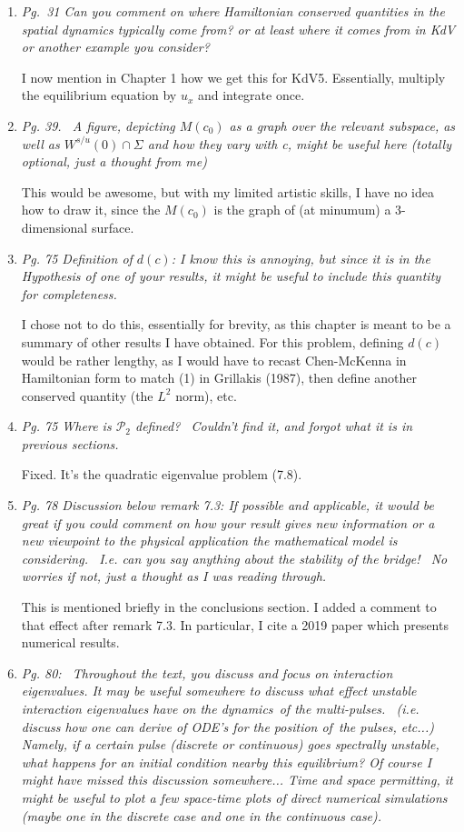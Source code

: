 \documentclass[11pt]{letter}
\begin{document}
\begin{enumerate}
\item \emph{Pg. 31 Can you comment on where Hamiltonian conserved quantities in the spatial dynamics typically come from? or at least where it comes from in KdV or another example you consider?}

I now mention in Chapter 1 how we get this for KdV5. Essentially, multiply the equilibrium equation by $u_x$ and integrate once.

\item \emph{Pg. 39.  A figure, depicting $M(c_0)$ as a graph over the relevant subspace, as well as $W^{s/u}(0) \cap \Sigma$ and how they vary with c, might be useful here (totally optional, just a thought from me)}

This would be awesome, but with my limited artistic skills, I have no idea how to draw it, since the $M(c_0)$ is the graph of (at minumum) a 3-dimensional surface.  

\item \emph{ Pg. 75 Definition of $d(c)$: I know this is annoying, but since it is in the Hypothesis of one of your results, it might be useful to include this quantity for completeness.}

I chose not to do this, essentially for brevity, as this chapter is meant to be a summary of other results I have obtained. For this problem, defining $d(c)$ would be rather lengthy, as I would have to recast Chen-McKenna in Hamiltonian form to match (1) in Grillakis (1987), then define another conserved quantity (the $L^2$ norm), etc. 

\item \emph{Pg. 75 Where is $\mathcal{P}_2$ defined?  Couldn't find it, and forgot what it is in previous sections.}

Fixed. It's the quadratic eigenvalue problem (7.8).

\item \emph{Pg. 78 Discussion below remark 7.3: If possible and applicable, it would be great if you could comment on how your result gives new information or a new viewpoint to the physical application the mathematical model is considering.  I.e. can you say anything about the stability of the bridge!  No worries if not, just a thought as I was reading through.} 

This is mentioned briefly in the conclusions section. I added a comment to that effect after remark 7.3. In particular, I cite a 2019 paper which presents numerical results.

\item \emph{Pg. 80:  Throughout the text, you discuss and focus on interaction eigenvalues. It may be useful somewhere to discuss what effect unstable interaction eigenvalues have on the dynamics of the multi-pulses.  (i.e. discuss how one can derive of ODE's for the position of the pulses, etc...) Namely, if a certain pulse (discrete or continuous) goes spectrally unstable, what happens for an initial condition nearby this equilibrium? Of course I might have missed this discussion somewhere... Time and space permitting, it might be useful to plot a few space-time plots of direct numerical simulations (maybe one in the discrete case and one in the continuous case).}


\end{enumerate}
\end{document}
